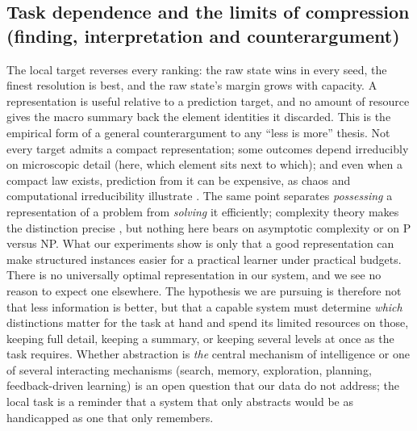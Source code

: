 \documentclass[11pt,a4paper]{article}
\begin{document}
\subsection{Task dependence and the limits of compression (finding, interpretation and counterargument)}
The local target reverses every ranking: the raw state wins in every seed, the
finest resolution is best, and the raw state's margin grows with capacity. A
representation is useful relative to a prediction target, and no amount of
resource gives the macro summary back the element identities it discarded. This
is the empirical form of a general counterargument to any ``less is more''
thesis. Not every target admits a compact representation; some outcomes depend
irreducibly on microscopic detail (here, which element sits next to which); and
even when a compact law exists, prediction from it can be expensive, as chaos
and computational irreducibility illustrate \citep{wolfram1985}. The same point
separates \emph{possessing} a representation of a problem from \emph{solving}
it efficiently; complexity theory makes the distinction precise
\citep{aaronson2013}, but nothing here bears on asymptotic complexity or on P
versus NP. What our experiments show is only that a good representation can
make structured instances easier for a practical learner under practical
budgets. There is no universally optimal representation in our system, and we
see no reason to expect one elsewhere. The hypothesis we are pursuing is
therefore not that less information is better, but that a capable system must
determine \emph{which} distinctions matter for the task at hand and spend its
limited resources on those, keeping full detail, keeping a summary, or keeping
several levels at once as the task requires. Whether abstraction is \emph{the}
central mechanism of intelligence or one of several interacting mechanisms
(search, memory, exploration, planning, feedback-driven learning) is an open
question that our data do not address; the local task is a reminder that a
system that only abstracts would be as handicapped as one that only remembers.
\end{document}

